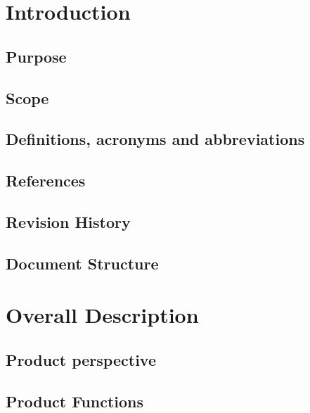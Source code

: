 


  \begin{titlepage}
    
  \end{titlepage}
  
  \tableofcontents
   
  \chapter{Introduction}
  \section{Purpose}
  
  \section{Scope}
  
  \section{Definitions, acronyms and abbreviations}
  
  \section{References}
  
  \section{Revision History}
  
  \section{Document Structure}
  
  
  \chapter{Overall Description}
  \section{Product perspective}
  
  \section{Product Functions}
  
